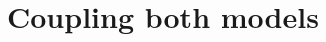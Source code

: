 




\newpage
\section{Coupling both models}

%
%
\newpage
\renewcommand\refname{Literature Cited}
{}


